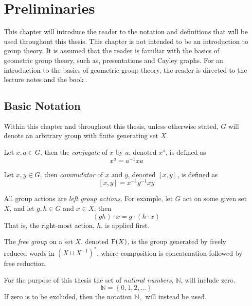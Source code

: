 \chapter{Preliminaries}

This chapter will introduce the reader to the notation and definitions that will be used throughout this thesis.
This chapter is not intended to be an introduction to group theory.
It is assumed that the reader is familiar with the basics of geometric group theory, such as, presentations and Cayley graphs.
For an introduction to the basics of geometric group theory, the reader is directed to the lecture notes \cite{AMSInotes,neumann1996short} and the book \cite{clay2017office}.

\section{Basic Notation}

Within this chapter and throughout this thesis, unless otherwise stated, $G$ will denote an arbitrary group with finite generating set $X$.

\begin{definition}
	Let $x,a\in G$, then the \emph{conjugate} of $x$ by $a$, denoted $x^a$, is defined as \[ x^a = a^{-1} x a \]
\end{definition}

\begin{definition}
	Let $x,y \in G$, then \emph{commutator} of $x$ and $y$, denoted $[x,y]$, is defined as \[ [x,y] = x^{-1}y^{-1}xy \]
\end{definition}

\begin{definition}
	All group actions are \emph{left group actions}.
	For example, let $G$ act on some given set $X$, and let $g,h\in G$ and $x \in X$, then
	\[
	  ( g h ) \cdot x = g \cdot ( h \cdot x)
	\]
	That is, the right-most action, $h$, is applied first.
\end{definition}

\begin{definition}
	The \emph{free group} on a set $X$, denoted $\operatorname{F}(X)$, is the group generated by freely reduced words in $\left( X \cup X^{-1} \right)^\ast$, where composition is concatenation followed by free reduction.
\end{definition}

\begin{definition}
	For the purpose of this thesis the set of \emph{natural numbers}, $\mathbb{N}$, will include zero.
	\[
	  \mathbb{N}
	  =
	  \left\lbrace
	    0, 1, 2, \ldots
	  \right\rbrace
	\]
	If zero is to be excluded, then the notation $\mathbb{N}_+$ will instead be used.
\end{definition}

